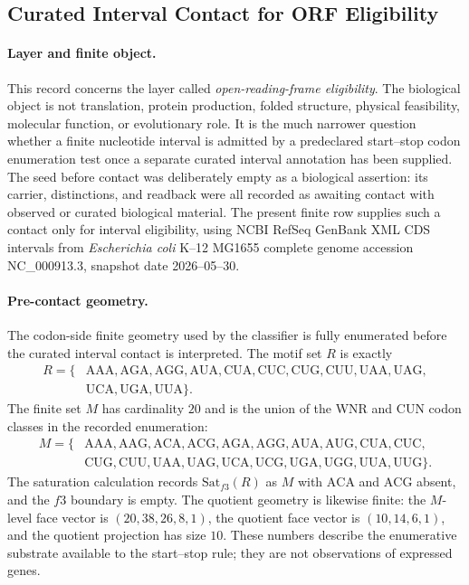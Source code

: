 
\subsection{Curated Interval Contact for ORF Eligibility}
\label{sec:bioreality-orf-eligibility-curated-interval-contact}

\paragraph{Layer and finite object.}
This record concerns the layer called \emph{open-reading-frame eligibility}.  The biological object is not translation, protein production, folded structure, physical feasibility, molecular function, or evolutionary role.  It is the much narrower question whether a finite nucleotide interval is admitted by a predeclared start--stop codon enumeration test once a separate curated interval annotation has been supplied.  The seed before contact was deliberately empty as a biological assertion: its carrier, distinctions, and readback were all recorded as awaiting contact with observed or curated biological material.  The present finite row supplies such a contact only for interval eligibility, using NCBI RefSeq GenBank XML CDS intervals from \emph{Escherichia coli} K--12 MG1655 complete genome accession NC\_000913.3, snapshot date 2026--05--30.

\paragraph{Pre-contact geometry.}
The codon-side finite geometry used by the classifier is fully enumerated before the curated interval contact is interpreted.  The motif set $R$ is exactly
$$
\begin{aligned}
R=\{&\mathrm{AAA},\mathrm{AGA},\mathrm{AGG},\mathrm{AUA},\mathrm{CUA},\mathrm{CUC},\mathrm{CUG},\mathrm{CUU},\mathrm{UAA},\mathrm{UAG},\\
&\mathrm{UCA},\mathrm{UGA},\mathrm{UUA}\}.
\end{aligned}
$$
The finite set $M$ has cardinality $20$ and is the union of the WNR and CUN codon classes in the recorded enumeration:
$$
\begin{aligned}
M=\{&\mathrm{AAA},\mathrm{AAG},\mathrm{ACA},\mathrm{ACG},\mathrm{AGA},\mathrm{AGG},\mathrm{AUA},\mathrm{AUG},\mathrm{CUA},\mathrm{CUC},\\
&\mathrm{CUG},\mathrm{CUU},\mathrm{UAA},\mathrm{UAG},\mathrm{UCA},\mathrm{UCG},\mathrm{UGA},\mathrm{UGG},\mathrm{UUA},\mathrm{UUG}\}.
\end{aligned}
$$
The saturation calculation records $\mathrm{Sat}_{f3}(R)$ as $M$ with $\mathrm{ACA}$ and $\mathrm{ACG}$ absent, and the $f3$ boundary is empty.  The quotient geometry is likewise finite: the $M$-level face vector is $(20,38,26,8,1)$, the quotient face vector is $(10,14,6,1)$, and the quotient projection has size $10$.  These numbers describe the enumerative substrate available to the start--stop rule; they are not observations of expressed genes.

